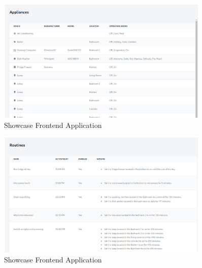 \begin{figure}
    \centering
    \includegraphics[width=0.9\textwidth]{images/frontend/appliances.png}
    \caption{Showcase Frontend Application}
    \label{fig:frontend_appliances}
\end{figure}

\begin{figure}
    \centering
    \includegraphics[width=0.9\textwidth]{images/frontend/routines.png}
    \caption{Showcase Frontend Application}
    \label{fig:frontend_routines}
\end{figure}